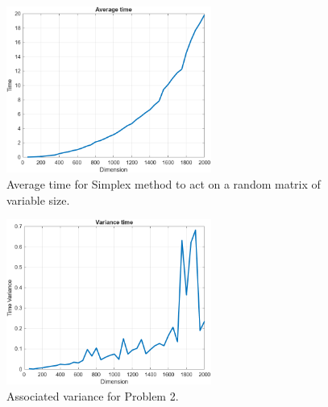 \begin{figure}[!h]
    \centering
    \includegraphics[width = 0.6\textwidth]{Figures/Average_time.png}
    \caption{Average time for Simplex method to act on a random matrix of variable size.}
    \label{fig:avg_time}
\end{figure}

\begin{figure}[!h]
    \centering
    \includegraphics[width = 0.6\textwidth]{Figures/Variance.png}
    \caption{Associated variance for Problem 2.}
    \label{fig:variance}
\end{figure}

